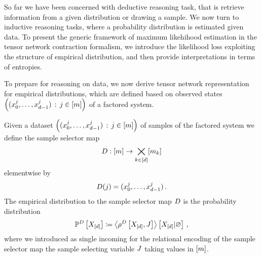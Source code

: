 
So far we have been concerned with deductive reasoning task, that is retrieve information from a given distribution or drawing a sample.
We now turn to inductive reasoning tasks, where a probability distribution is estimated given data.
To present the generic framework of maximum likehihood estimation in the tensor network contraction formalism, we introduce the likelihood loss exploiting the structure of empirical distribution, and then provide interpretations in terms of entropies.

\label{sec:empDistribution}

To prepare for reasoning on data, we now derive tensor network representation for empirical distributions, which are defined based on observed states $\left(({x_{0}^{j},\ldots,x_{d-1}^{j}})\,:\,j\in[m]\right)$ of a factored system.

\begin{definition}
    \label{def:dataMap}
    Given a dataset $\left(({x_{0}^{j},\ldots,x_{d-1}^{j}})\,:\,j\in[m]\right)$ of samples of the factored system we define the sample selector map
    \begin{align*}
        D : [m] \rightarrow \bigtimes_{k\in[d]}[m_{k}]
    \end{align*}
    elementwise by
    \begin{align*}
         D(j) = ({x_{0}^{j},\ldots,x_{d-1}^{j}}) \, .
    \end{align*}
    The empirical distribution to the sample selector map $D$ is the probability distribution
    \begin{align*}
        \mathbb{P}^{D}\left[X_{[d]}\right]
        \coloneqq \left\langle \rho^{D}\left[X_{[d]},J\right]\right\rangle \left[ X_{[d]} | \varnothing \right] \, ,
    \end{align*}
    where we introduced as single incoming for the relational encoding of the sample selector map the sample selecting variable $J$ taking values in $[m]$.
\end{definition}

